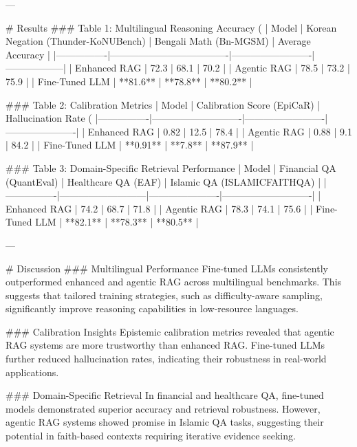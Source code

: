 ---

# Results  
### Table 1: Multilingual Reasoning Accuracy (%
| Model          | Korean Negation (Thunder-KoNUBench) | Bengali Math (Bn-MGSM) | Average Accuracy |
|----------------|-------------------------------------|-------------------------|------------------|
| Enhanced RAG   | 72.3                               | 68.1                   | 70.2             |
| Agentic RAG    | 78.5                               | 73.2                   | 75.9             |
| Fine-Tuned LLM | **81.6**                           | **78.8**               | **80.2**         |

### Table 2: Calibration Metrics
| Model          | Calibration Score (EpiCaR) | Hallucination Rate (%
|----------------|----------------------------|-------------------------|----------------------|
| Enhanced RAG   | 0.82                       | 12.5                   | 78.4                |
| Agentic RAG    | 0.88                       | 9.1                    | 84.2                |
| Fine-Tuned LLM | **0.91**                   | **7.8**                | **87.9**            |

### Table 3: Domain-Specific Retrieval Performance
| Model          | Financial QA (QuantEval) | Healthcare QA (EAF) | Islamic QA (ISLAMICFAITHQA) |
|----------------|---------------------------|----------------------|----------------------------|
| Enhanced RAG   | 74.2                      | 68.7                | 71.8                      |
| Agentic RAG    | 78.3                      | 74.1                | 75.6                      |
| Fine-Tuned LLM | **82.1**                  | **78.3**            | **80.5**                  |

---

# Discussion  
### Multilingual Performance  
Fine-tuned LLMs consistently outperformed enhanced and agentic RAG across multilingual benchmarks. This suggests that tailored training strategies, such as difficulty-aware sampling, significantly improve reasoning capabilities in low-resource languages.

### Calibration Insights  
Epistemic calibration metrics revealed that agentic RAG systems are more trustworthy than enhanced RAG. Fine-tuned LLMs further reduced hallucination rates, indicating their robustness in real-world applications.

### Domain-Specific Retrieval  
In financial and healthcare QA, fine-tuned models demonstrated superior accuracy and retrieval robustness. However, agentic RAG systems showed promise in Islamic QA tasks, suggesting their potential in faith-based contexts requiring iterative evidence seeking.

